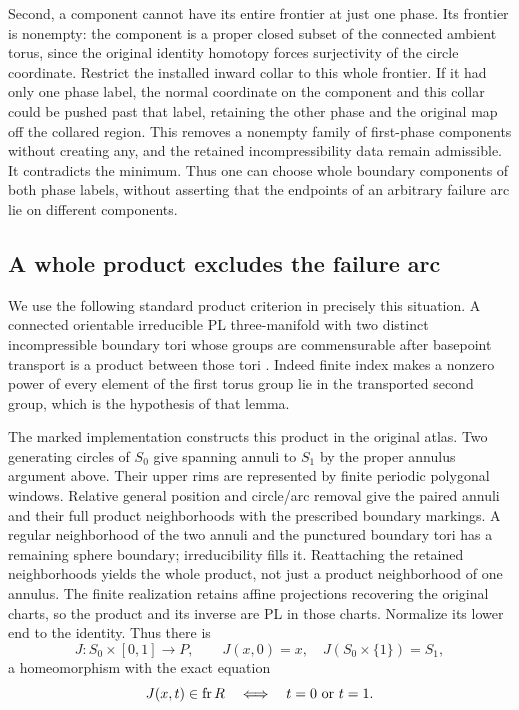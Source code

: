 Second, a component cannot have its entire frontier at just one phase.
Its frontier is nonempty: the component is a proper closed subset of
the connected ambient torus, since the original identity homotopy
forces surjectivity of the circle coordinate. Restrict the installed
inward collar to this whole frontier. If it had only one phase label,
the normal coordinate on the component and this collar could be pushed
past that label, retaining the other phase and the original map off
the collared region. This removes a nonempty family of first-phase
components without creating any, and the retained incompressibility
data remain admissible. It contradicts the minimum. Thus one can choose
whole boundary components of both phase labels, without asserting that
the endpoints of an arbitrary failure arc lie on different components.

\subsection{A whole product excludes the failure arc}

We use the following standard product criterion in precisely this
situation. A connected orientable irreducible PL three-manifold with
two distinct incompressible boundary tori whose groups are commensurable
after basepoint transport is a product between those tori
\cite[Lemma 5.1, pp.~72--73]{Waldhausen1968}. Indeed finite index makes a
nonzero power of every element of the first torus group lie in the
transported second group, which is the hypothesis of that lemma.

The marked implementation constructs this product in the original
atlas. Two generating circles of $S_0$ give spanning annuli to $S_1$
by the proper annulus argument above. Their upper rims are represented
by finite periodic polygonal windows. Relative general position and
circle/arc removal give the paired annuli and their full product
neighborhoods with the prescribed boundary markings. A regular
neighborhood of the two annuli and the punctured boundary tori has a
remaining sphere boundary; irreducibility fills it. Reattaching the
retained neighborhoods yields the whole product, not just a product
neighborhood of one annulus. The finite realization retains affine
projections recovering the original charts, so the product and its
inverse are PL in those charts. Normalize its lower end to the identity.
Thus there is
\[
 J:S_0\times[0,1]\longrightarrow P,\qquad
 J(x,0)=x,\quad J(S_0\times\{1\})=S_1,
\]
a homeomorphism with the exact equation
\[
 J(x,t)\in\operatorname{fr}R
 \quad\Longleftrightarrow\quad t=0\ \hbox{or}\ t=1.
\]


